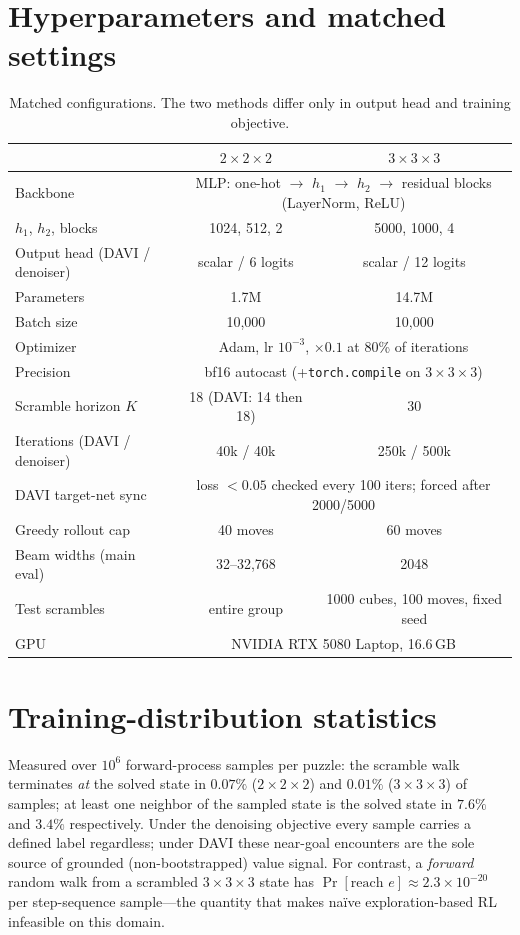 \documentclass[11pt]{article}
\begin{document}
\appendix

\section{Hyperparameters and matched settings}
\label{app:hyper}

\begin{table}[h]
\centering
\small
\begin{tabular}{lcc}
\toprule
& $2{\times}2{\times}2$ & $3{\times}3{\times}3$ \\
\midrule
Backbone & \multicolumn{2}{c}{MLP: one-hot $\to$ $h_1$ $\to$ $h_2$ $\to$ residual blocks (LayerNorm, ReLU)} \\
$h_1$, $h_2$, blocks & 1024, 512, 2 & 5000, 1000, 4 \\
Output head (DAVI / denoiser) & scalar / 6 logits & scalar / 12 logits \\
Parameters & 1.7M & 14.7M \\
Batch size & 10{,}000 & 10{,}000 \\
Optimizer & \multicolumn{2}{c}{Adam, lr $10^{-3}$, $\times0.1$ at 80\% of iterations} \\
Precision & \multicolumn{2}{c}{bf16 autocast (+\texttt{torch.compile} on $3{\times}3{\times}3$)} \\
Scramble horizon $K$ & 18 (DAVI: 14 then 18) & 30 \\
Iterations (DAVI / denoiser) & 40k / 40k & 250k / 500k \\
DAVI target-net sync & \multicolumn{2}{c}{loss $<0.05$ checked every 100 iters; forced after 2000/5000} \\
Greedy rollout cap & 40 moves & 60 moves \\
Beam widths (main eval) & 32--32{,}768 & 2048 \\
Test scrambles & entire group & 1000 cubes, 100 moves, fixed seed \\
GPU & \multicolumn{2}{c}{NVIDIA RTX 5080 Laptop, 16.6\,GB} \\
\bottomrule
\end{tabular}
\caption{Matched configurations. The two methods differ only in output head
and training objective.}
\label{tab:hyper}
\end{table}

\section{Training-distribution statistics}

Measured over $10^6$ forward-process samples per puzzle: the scramble walk
terminates \emph{at} the solved state in $0.07\%$ ($2{\times}2{\times}2$) and
$0.01\%$ ($3{\times}3{\times}3$) of samples; at least one neighbor of the
sampled state is the solved state in $7.6\%$ and $3.4\%$ respectively. Under
the denoising objective every sample carries a defined label regardless; under
DAVI these near-goal encounters are the sole source of grounded (non-bootstrapped)
value signal. For contrast, a \emph{forward} random walk from a scrambled
$3{\times}3{\times}3$ state has $\Pr[\text{reach } e] \approx 2.3\times10^{-20}$
per step-sequence sample---the quantity that makes na\"ive exploration-based
RL infeasible on this domain.
\end{document}
